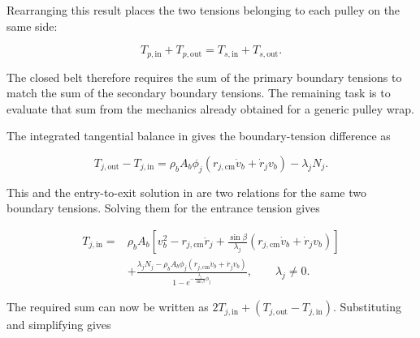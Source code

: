 \documentclass[11pt]{report}
\numberwithin{equation}{section}
\begin{document}
Rearranging this result places the two tensions belonging to each pulley on
the same side:

\begin{equation}
    T_{p,\mathrm{in}}+T_{p,\mathrm{out}}
    =
    T_{s,\mathrm{in}}+T_{s,\mathrm{out}}.
    \label{eq:straight_span_boundary_tension_sum}
\end{equation}

The closed belt therefore requires the sum of the primary boundary tensions
to match the sum of the secondary boundary tensions. The remaining task is to
evaluate that sum from the mechanics already obtained for a generic pulley
wrap.

The integrated tangential balance in
 gives the boundary-tension
difference as

\begin{equation}
    T_{j,\mathrm{out}}-T_{j,\mathrm{in}}
    =
    \rho_bA_b\phi_j
    \left(
        r_{j,\mathrm{cm}}\dot v_b+
        \dot r_jv_b
    \right)
    -\lambda_jN_j.
    \label{eq:generic_wrap_boundary_tension_difference}
\end{equation}

This and the entry-to-exit solution in
 are two relations for the same two boundary
tensions. Solving them for the entrance tension gives

\begin{equation}
\begin{aligned}
    T_{j,\mathrm{in}}
    ={}&
    \rho_bA_b
    \left[
        v_b^2-r_{j,\mathrm{cm}}\ddot r_j
        +
        \frac{\sin\beta}{\lambda_j}
        \left(
            r_{j,\mathrm{cm}}\dot v_b+
            \dot r_jv_b
        \right)
    \right]
    \\
    &+
    \frac{
        \lambda_jN_j
        -
        \rho_bA_b\phi_j
        \left(
            r_{j,\mathrm{cm}}\dot v_b+
            \dot r_jv_b
        \right)
    }{
        1-e^{-\frac{\lambda_j}{\sin\beta}\phi_j}
    },
    \qquad \lambda_j\neq0.
\end{aligned}
    \label{eq:generic_wrap_entrance_tension}
\end{equation}

The required sum can now be written as
$2T_{j,\mathrm{in}}+(T_{j,\mathrm{out}}-T_{j,\mathrm{in}})$. Substituting
and simplifying gives
\end{document}
